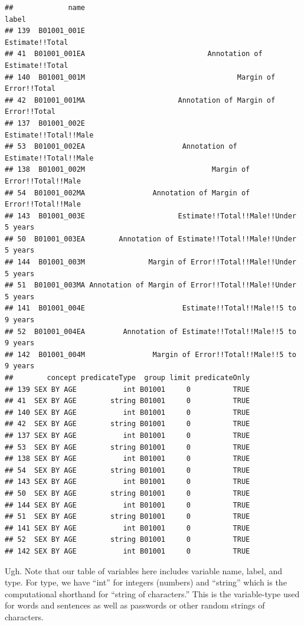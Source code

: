 \documentclass[
  openany]{book}
\begin{document}
\begin{verbatim}
##             name                                                     label
## 139  B01001_001E                                           Estimate!!Total
## 41  B01001_001EA                             Annotation of Estimate!!Total
## 140  B01001_001M                                    Margin of Error!!Total
## 42  B01001_001MA                      Annotation of Margin of Error!!Total
## 137  B01001_002E                                     Estimate!!Total!!Male
## 53  B01001_002EA                       Annotation of Estimate!!Total!!Male
## 138  B01001_002M                              Margin of Error!!Total!!Male
## 54  B01001_002MA                Annotation of Margin of Error!!Total!!Male
## 143  B01001_003E                      Estimate!!Total!!Male!!Under 5 years
## 50  B01001_003EA        Annotation of Estimate!!Total!!Male!!Under 5 years
## 144  B01001_003M               Margin of Error!!Total!!Male!!Under 5 years
## 51  B01001_003MA Annotation of Margin of Error!!Total!!Male!!Under 5 years
## 141  B01001_004E                       Estimate!!Total!!Male!!5 to 9 years
## 52  B01001_004EA         Annotation of Estimate!!Total!!Male!!5 to 9 years
## 142  B01001_004M                Margin of Error!!Total!!Male!!5 to 9 years
##        concept predicateType  group limit predicateOnly
## 139 SEX BY AGE           int B01001     0          TRUE
## 41  SEX BY AGE        string B01001     0          TRUE
## 140 SEX BY AGE           int B01001     0          TRUE
## 42  SEX BY AGE        string B01001     0          TRUE
## 137 SEX BY AGE           int B01001     0          TRUE
## 53  SEX BY AGE        string B01001     0          TRUE
## 138 SEX BY AGE           int B01001     0          TRUE
## 54  SEX BY AGE        string B01001     0          TRUE
## 143 SEX BY AGE           int B01001     0          TRUE
## 50  SEX BY AGE        string B01001     0          TRUE
## 144 SEX BY AGE           int B01001     0          TRUE
## 51  SEX BY AGE        string B01001     0          TRUE
## 141 SEX BY AGE           int B01001     0          TRUE
## 52  SEX BY AGE        string B01001     0          TRUE
## 142 SEX BY AGE           int B01001     0          TRUE
\end{verbatim}

Ugh. Note that our table of variables here includes variable name, label, and type. For type, we have ``int'' for integers (numbers) and ``string'' which is the computational shorthand for ``string of characters.'' This is the variable-type used for words and sentences as well as passwords or other random strings of characters.
\end{document}
